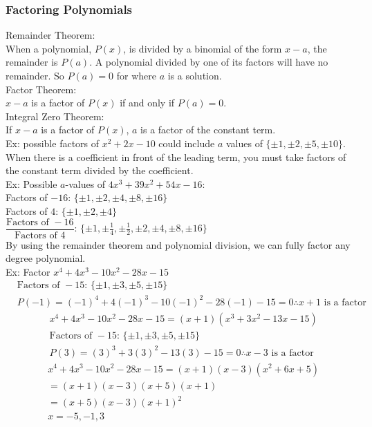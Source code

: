\documentclass[11pt, fleqn]{article}
\begin{document}
\subsubsection{Factoring Polynomials}
Remainder Theorem:\\
When a polynomial, $P(x)$, is divided by a binomial of the form $x-a$, the remainder is $P(a)$. A polynomial divided by one of its factors will have no remainder. So $P(a)=0$ for where $a$ is a solution.\\
Factor Theorem:\\
$x-a$ is a factor of $P(x)$ if and only if $P(a)=0$.\\
Integral Zero Theorem:\\
If $x-a$ is a factor of $P(x)$, $a$ is a factor of the constant term.\\
Ex: possible factors of $x^2+2x-10$ could include $a$ values of $\{\pm1,\pm2,\pm5,\pm10\}$.\\
When there is a coefficient in front of the leading term, you must take factors of the constant term divided by the coefficient.\\
Ex: Possible $a$-values of $4x^3+39x^2+54x-16$:\\
Factors of $-16$: $\{\pm1,\pm2,\pm4,\pm8,\pm16\}$\\
Factors of $4$: $\{\pm1,\pm2,\pm4\}$\\
$\dfrac{\text{Factors of }-16}{\text{Factors of }4}:\,\{\pm1,\pm\frac{1}{4},\pm\frac{1}{2},\pm2,\pm4,\pm8,\pm16\}$\\
By using the remainder theorem and polynomial division, we can fully factor any degree polynomial.\\
Ex: Factor $x^4+4x^3-10x^2-28x-15$\\
\begin{align*}
    &\text{Factors of }-15:\,\{\pm1,\pm3,\pm5,\pm15\}\\
    &P(-1)=(-1)^4+4(-1)^3-10(-1)^2-28(-1)-15=0\therefore x+1\text{ is a factor}
\end{align*}
\begin{align*}
    &x^4+4x^3-10x^2-28x-15=(x+1)(x^3+3x^2-13x-15)\\
    &\text{Factors of }-15:\,\{\pm1,\pm3,\pm5,\pm15\}\\
    &P(3)=(3)^3+3(3)^2-13(3)-15=0\therefore x-3\text{ is a factor}
\end{align*}
\begin{align*}
    &x^4+4x^3-10x^2-28x-15=(x+1)(x-3)(x^2+6x+5)\\
    &=(x+1)(x-3)(x+5)(x+1)\\
    &=(x+5)(x-3)(x+1)^2\\
    &x=-5,-1,3
\end{align*}
\end{document}
